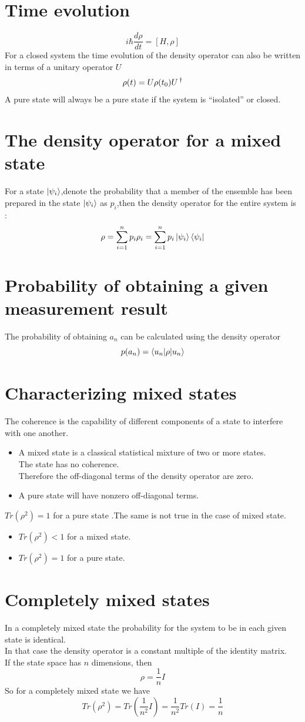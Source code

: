 \documentclass[12pt,oneside]{book}
\begin{document}
\section{Time evolution}
\[ i\hbar\frac{d\rho}{dt} = [H,\rho] \]
For a closed system the time evolution of the density operator can also be written in terms of a unitary operator $U$\\
\[ \rho(t) = U\rho(t_0)U\operatorname{^\dagger} \]
A pure state will always be a pure state if the system is “isolated” or closed.
\section{The density operator for a mixed state}
For a state $\ket{\psi_i}$,denote the probability that a member of the ensemble has been prepared in the state $\ket{\psi_i}$ as $p_i$,then the density operator for the entire system is :
\[ \rho = \sum_{i=1}^n p_i\rho_i = \sum^n_{i=1}p_i\ket{\psi_i}\bra{\psi_i} \]

\section{Probability of obtaining a given measurement result}
The probability of obtaining $a_n$ can be calculated using the density operator
\[ p(a_n) = \braket{u_n|\rho|u_n}\]
\section{Characterizing mixed states}
The coherence is the capability of different components of a state to interfere with one another.
\begin{itemize}
    \item A mixed state is a classical statistical mixture of two or more states.\\
          The state has no coherence.\\
          Therefore the off-diagonal terms of the density operator are zero.
    \item A pure state will have nonzero off-diagonal terms.
\end{itemize}
$Tr(\rho^2) =1 $ for a pure state .The same is not true in the case of mixed state.
\begin{itemize}
    \item $Tr(\rho^2) <1$ for a mixed state.
    \item $Tr(\rho^2) = 1$ for a pure state.
\end{itemize}
\section{Completely mixed states}
In a completely mixed state the probability for the system to be in each given state is identical.\\
In that case the density operator is a constant multiple of the identity matrix.\\
If the state space has $n$ dimensions, then
\[ \rho = \frac{1}{n}I \]
So for a completely mixed state we have
\[ Tr(\rho^2) = Tr(\frac{1}{n^2}I) = \frac{1}{n^2}Tr(I) = \frac{1}{n}  \]
\end{document}
